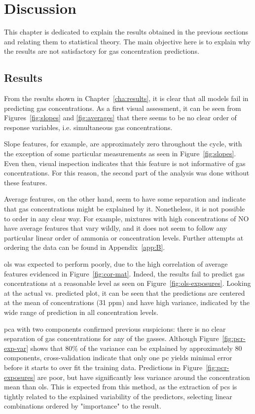 \chapter{Discussion}
\label{cha:discussion}

This chapter is dedicated to explain the results obtained in the previous sections and relating them to statistical theory. The main objective here is to explain why the results are not satisfactory for gas concentration predictions.

\section{Results}
\label{sec:discussion-results}

From the results shown in Chapter~\ref{cha:results}, it is clear that all models fail in predicting gas concentrations. As a first visual assessment, it can be seen from Figures~\ref{fig:slopes} and \ref{fig:averages} that there seems to be no clear order of response variables, i.e. simultaneous gas concentrations.

 Slope features, for example, are approximately zero throughout the cycle, with the exception of some particular measurements as seen in Figure~\ref{fig:slopes}. Even then, visual inspection indicates that this feature is not informative of gas concentrations. For this reason, the second part of the analysis was done without these features.
 
 Average features, on the other hand, seem to have some separation and indicate that gas concentrations might be explained by it. Nonetheless, it is not possible to order in any clear way. For example, mixtures with high concentrations of NO have average features that vary wildly, and it does not seem to follow any particular linear order of ammonia or \nox concentration levels. Further attempts at ordering the data can be found in Appendix~\ref{app:B}. 
 
\acrlong{ols} was expected to perform poorly, due to the high correlation of average features evidenced in Figure~\ref{fig:cor-mat}. Indeed, the results fail to predict gas concentrations at a reasonable level as seen on Figure~\ref{fig:ols-exposures}. Looking at the actual vs. predicted plot, it can be seen that the predictions are centered at the mean of concentrations (31 ppm) and have high variance, indicated by the wide range of prediction in all concentration levels.

\acrshort{pca} with two components confirmed previous suspicions: there is no clear separation of gas concentrations for any of the gasses. Although Figure~\ref{fig:pcr-exp-var} shows that 80\% of the variance can be explained by approximately 80 components, cross-validation indicate that only one \acrshort{pc} yields minimal error before it starts to over fit the training data. Predictions in Figure~\ref{fig:pcr-exposures} are poor, but have significantly less variance around the concentration mean than \acrshort{ols}. This is expected from this method, as the extraction of \acrshort{pc}s is tightly related to the explained variability of the predictors, selecting linear combinations ordered by "importance" to the result.

